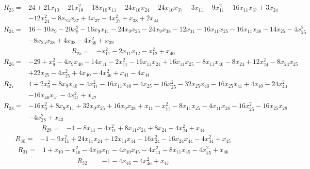 \begin{align*}
 R_{23}={}&24 +21x_{10} -21x_{10}^{2} -18x_{10}x_{11} -24x_{10}x_{24} -24x_{10}x_{37} +3x_{11} -9x_{11}^{2} -16x_{11}x_{37} +3x_{24}\\
 &-12x_{24}^{2} -8x_{24}x_{37} +4x_{37} -4x_{37}^{2} +x_{38} +2x_{44}
\end{align*}
\begin{align*}
 R_{24}={}&16 -10x_{9} -20x_{9}^{2} -16x_{9}x_{11} -24x_{9}x_{25} -24x_{9}x_{38} -12x_{11} -16x_{11}x_{25} -16x_{11}x_{38} -14x_{25} -4x_{25}^{2}\\
 &-8x_{25}x_{38} +4x_{38} -4x_{38}^{2} +x_{39}
\end{align*}
\begin{align*}
 R_{25}={}&-x_{11}^{2} -2x_{11}x_{12} -x_{12}^{2} +x_{40}
\end{align*}
\begin{align*}
 R_{26}={}&-29 +x_{9}^{2} -4x_{9}x_{40} -14x_{11} -2x_{11}^{2} -16x_{11}x_{24} +16x_{11}x_{25} -8x_{11}x_{40} -8x_{24} +12x_{24}^{2} -8x_{24}x_{25}\\
 &+22x_{25} -4x_{25}^{2} +4x_{40} -4x_{40}^{2} +x_{41} -4x_{44}
\end{align*}
\begin{align*}
 R_{27}={}&4 +2x_{9}^{2} -8x_{9}x_{40} -4x_{11}^{2} -16x_{11}x_{40} -4x_{25} -16x_{25}^{2} -32x_{25}x_{40} -16x_{25}x_{41} +4x_{40} -24x_{40}^{2}\\
 &-16x_{40}x_{41} -4x_{41}^{2} +x_{42}
\end{align*}
\begin{align*}
 R_{28}={}&-16x_{9}^{2} +8x_{9}x_{11} +32x_{9}x_{25} +16x_{9}x_{28} +x_{11} -x_{11}^{2} -8x_{11}x_{25} -4x_{11}x_{28} -16x_{25}^{2} -16x_{25}x_{28}\\
 &-4x_{28}^{2} +x_{43}
\end{align*}
\begin{align*}
 R_{29}={}&-1 -8x_{11} -4x_{11}^{2} +8x_{11}x_{24} +8x_{24} -4x_{24}^{2} +x_{44}
\end{align*}
\begin{align*}
 R_{30}={}&-1 -9x_{11}^{2} +24x_{11}x_{24} +12x_{11}x_{44} -16x_{24}^{2} -16x_{24}x_{44} -4x_{44}^{2} +x_{45}
\end{align*}
\begin{align*}
 R_{31}={}&1 +x_{10} -x_{10}^{2} -4x_{10}x_{11} -4x_{10}x_{45} -4x_{11}^{2} -8x_{11}x_{45} -4x_{45}^{2} +x_{46}
\end{align*}
\begin{align*}
 R_{32}={}&-1 -4x_{46} -4x_{46}^{2} +x_{47}
\end{align*}
